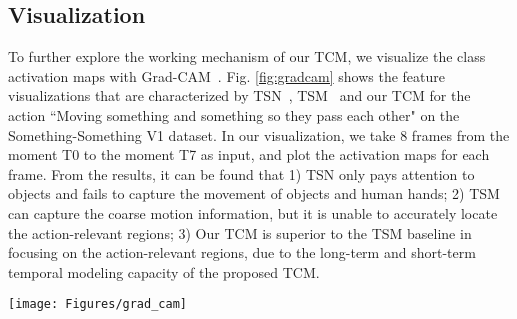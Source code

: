 \documentclass[journal]{IEEEtran}
\begin{document}
\subsection{Visualization}
To further explore the working mechanism of our TCM, we visualize the class activation maps with Grad-CAM~\cite{zhou2016learning,selvaraju2017grad,jacobgilpytorchcam}. Fig. \ref{fig:gradcam} shows the feature visualizations that are characterized by TSN~\cite{wang2016temporal}, TSM~\cite{lin2019tsm} and our TCM for the action ``Moving something and something so they pass each other" on the Something-Something V1 dataset. In our visualization, we take 8 frames from the moment T0 to the moment T7 as input, and plot the activation maps for each frame. From the results, it can be found that 1) TSN only pays attention to objects and fails to capture the movement of objects and human hands; 2) TSM can capture the coarse motion information, but it is unable to accurately locate the action-relevant regions; 3) Our TCM is superior to the TSM baseline in focusing on the action-relevant regions, due to the long-term and short-term temporal modeling capacity of the proposed TCM.

\begin{figure*}[!tbp]
  \texttt{[image: Figures/grad\_cam]}
  \caption{Visualization of activation maps with Grad-CAM~\cite{jacobgilpytorchcam} for the deep features of the action ``Moving something and something so they pass each other", where the deep features are extracted by TSN, TSM and our TCM methods, respectively. All methods use 8-frame input to visualize on the Something-Something V1 dataset. In the first row, we plot the 8 RGB raw frames, then we plot the activation maps of TSN, TSM and our TCM. We use red bounding box to highlight the regions that need to be focused on in the activation maps. Compared to TSN and TSM, it can be noticed that TCM is able to learn the deep features related to human interaction with objects \textit{i.e. the red bounding boxes at moment T3-T6 frames.} Particularly, in contrast to TSM, we can find that the exploited TCM has the following advantages: 1) locating the area where the cup and bottle pass through each other more accurate (\textit{i.e.} frames at moment T3), 2) depicting the interaction of the hand and cup more precise (\textit{i.e.} frames at moment T4), 3) considering the connection between the cup and the bottle (\textit{i.e.} frames at moment T5 and T6).}
  \label{fig:gradcam}
\end{figure*}
\end{document}

